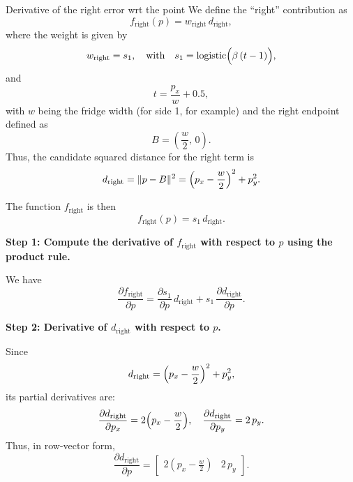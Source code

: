 \documentclass[11pt]{article}
\begin{document}
\begin{section} {Derivative of the right error wrt the point}
    We define the “right” contribution as
    \begin{equation}
        f_{\mathrm{right}}(p) = w_{\mathrm{right}}\, d_{\mathrm{right}},
    \end{equation}
    where the weight is given by
    \begin{equation}
        w_{\mathrm{right}} = s_1, \quad \text{with} \quad s_1 = \operatorname{logistic}\Bigl(\beta\,(t-1)\Bigr),
    \end{equation}
    and
    \begin{equation}
        t = \frac{p_x}{w} + 0.5,
    \end{equation}
    with \(w\) being the fridge width (for side 1, for example) and the right endpoint defined as
    \begin{equation}
        B = \left(\frac{w}{2},\,0\right).
    \end{equation}
    Thus, the candidate squared distance for the right term is
    \begin{equation}
        d_{\mathrm{right}} = \|p - B\|^2 = \Bigl(p_x - \frac{w}{2}\Bigr)^2 + p_y^2.
    \end{equation}

    The function \(f_{\mathrm{right}}\) is then
    \begin{equation}
        f_{\mathrm{right}}(p) = s_1\, d_{\mathrm{right}}.
    \end{equation}

    \textbf{Step 1: Compute the derivative of \(f_{\mathrm{right}}\) with respect to \(p\) using the product rule.}

    We have
    \begin{equation}
        \frac{\partial f_{\mathrm{right}}}{\partial p} = \frac{\partial s_1}{\partial p}\, d_{\mathrm{right}} + s_1\, \frac{\partial d_{\mathrm{right}}}{\partial p}.
    \end{equation}

    \textbf{Step 2: Derivative of \(d_{\mathrm{right}}\) with respect to \(p\).}

    Since
    \begin{equation}
        d_{\mathrm{right}} = \Bigl(p_x - \frac{w}{2}\Bigr)^2 + p_y^2,
    \end{equation}
    its partial derivatives are:
    \begin{equation}
        \frac{\partial d_{\mathrm{right}}}{\partial p_x} = 2\Bigl(p_x - \frac{w}{2}\Bigr),\quad
        \frac{\partial d_{\mathrm{right}}}{\partial p_y} = 2\,p_y.
    \end{equation}
    Thus, in row-vector form,
    \begin{equation}
        \frac{\partial d_{\mathrm{right}}}{\partial p} = \begin{bmatrix} 2\left(p_x-\frac{w}{2}\right) & 2\,p_y \end{bmatrix}.
    \end{equation}


\end{section}
\end{document}
